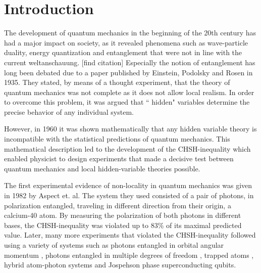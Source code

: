 \color{tudelft-cyan}
\chapter{Introduction}
\color{black}


\label{intro}


The development of quantum mechanics in the beginning of the 20th century has had a major impact on society, as it revealed phenomena such as wave-particle duality, energy quantization and entanglement that were not in line with the current weltanschauung. [find citation] Especially the notion of entanglement has long been debated due to a paper published by Einstein, Podolsky and Rosen in 1935. They stated, by means of a thought experiment, that the theory of quantum mechanics was not complete as it does not allow local realism. \cite{einstein1935can} In order to overcome this problem, it was argued that `` hidden" variables determine the precise behavior of any individual system. \cite{bohm1952suggested,bohm1952suggested2}

However, in 1960 it was shown mathematically that any hidden variable theory is incompatible with the statistical predictions of quantum mechanics. \cite{bell1964on} This mathematical description led to the development of the CHSH-inequality which enabled physicist to design experiments that made a decisive test between quantum mechanics and local hidden-variable theories possible. \cite{clauser1969proposed}

The first experimental evidence of non-locality in quantum mechanics was given in 1982 by Aspect et. al. \cite{ aspect1982experimental, aspect1982experimental2} The system they used consisted of a pair of photons, in polarization entangled, traveling in different direction from their origin, a calcium-40 atom. By measuring the polarization of both photons in different bases, the CHSH-inequality was violated up to 83\% of its maximal predicted value. Later, many more experiments that violated the CHSH-inequality followed using a variety of systems such as photons entangled in orbital angular momentum \cite{mair2001entanglement}, photons entangled in multiple degrees of freedom \cite{barreiro2005generation}, trapped atoms \cite{rowe2001experimental}, hybrid atom-photon systems \cite{blinov2004observation} and Jospehson phase superconducting qubits. \cite{ansmann2009violation}

